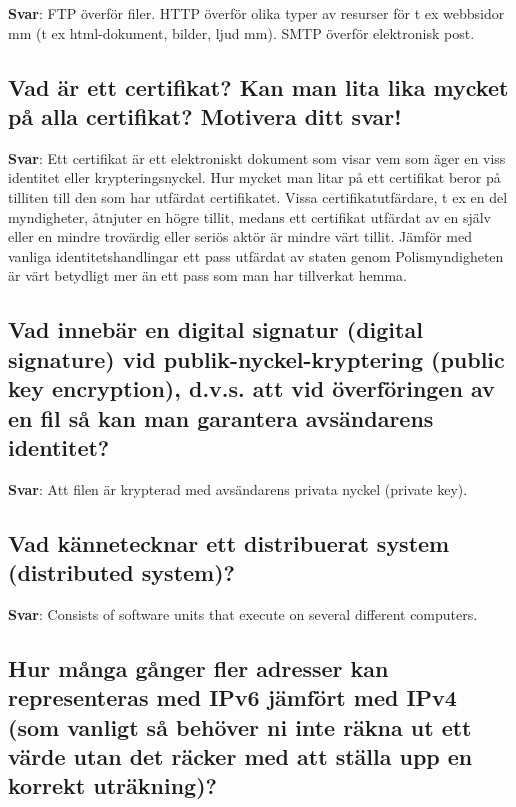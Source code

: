 \documentclass[a4paper,11pt,oneside]{article}
\begin{document}
\begin{sloppypar}
\textbf{Svar}: FTP \"overf\"or filer. HTTP \"overf\"or olika typer av resurser f\"or t ex webbsidor mm (t ex html-dokument, bilder, ljud mm). SMTP \"overf\"or elektronisk post.



\subsection{Vad \"ar ett certifikat? Kan man lita lika mycket p\r{a} alla certifikat? Motivera ditt svar!}

\label{q:155:sa:sv:True}

\textbf{Svar}: Ett certifikat \"ar ett elektroniskt dokument som visar vem som \"ager en viss identitet eller krypteringsnyckel. Hur mycket man litar p\r{a} ett certifikat beror p\r{a} tilliten till den som har utf\"ardat certifikatet. Vissa certifikatutf\"ardare, t ex en del myndigheter, \r{a}tnjuter en h\"ogre tillit, medans ett certifikat utf\"ardat av en sj\"alv eller en mindre trov\"ardig eller seri\"os akt\"or \"ar mindre v\"art tillit. J\"amf\"or med vanliga identitetshandlingar {\textendash} ett pass utf\"ardat av staten genom Polismyndigheten \"ar v\"art betydligt mer \"an ett pass som man har tillverkat hemma.



\subsection{Vad inneb\"ar en digital signatur (digital signature) vid publik-nyckel-kryptering (public key encryption), d.v.s. att vid \"overf\"oringen av en fil s\r{a} kan man garantera avs\"andarens identitet?}

\label{q:156:sa:sv:True}

\textbf{Svar}: Att filen \"ar krypterad med avs\"andarens privata nyckel (private key).



\subsection{Vad k\"annetecknar ett distribuerat system (distributed system)?}

\label{q:157:sa:sv:True}

\textbf{Svar}: Consists of software units that execute on several different computers.



\subsection{Hur m\r{a}nga g\r{a}nger fler adresser kan representeras med IPv6 j\"amf\"ort med IPv4 (som vanligt s\r{a} beh\"over ni inte r\"akna ut ett v\"arde utan det r\"acker med att st\"alla upp en korrekt utr\"akning)?}


\end{sloppypar}
\end{document}
